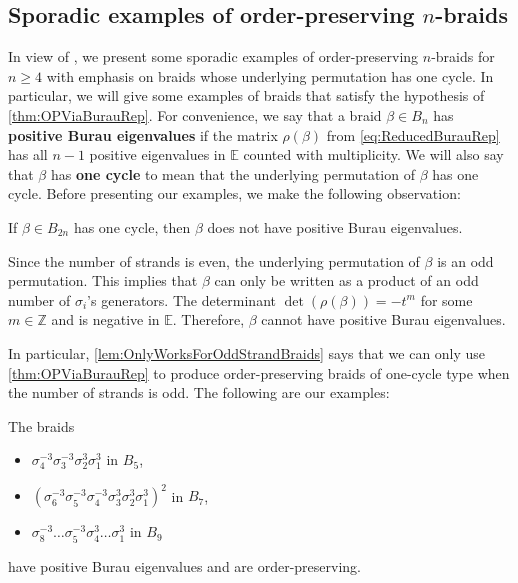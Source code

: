 \documentclass{amsart}
\makeatletter
\renewenvironment{proof}[1][\proofname]{%
   \par\pushQED{\qed}\normalfont%
   \topsep6\p@\@plus6\p@\relax
   \trivlist\item[\hskip\labelsep\bfseries#1\@addpunct{.}]%
   \ignorespaces
}{%
   \popQED\endtrivlist\@endpefalse
}
\makeatother
\begin{document}
\subsection{Sporadic examples of order-preserving $n$-braids}
\label{subsec:SporadicExamples}

In view of \cite[Question 6.10]{KinRolfsen18}, we present some sporadic examples of order-preserving $n$-braids for $n \geq 4$ with emphasis on braids whose underlying permutation has one cycle. In particular, we will give some examples of braids that satisfy the hypothesis of \cref{thm:OPViaBurauRep}. For convenience, we say that a braid $\beta \in B_n$ has {\bf positive Burau eigenvalues} if the matrix $\rho(\beta)$ from \cref{eq:ReducedBurauRep} has all $n-1$ positive eigenvalues in $\mathbb{E}$ counted with multiplicity. We will also say that $\beta$ has {\bf one cycle} to mean that the underlying permutation of $\beta$ has one cycle. Before presenting our examples, we make the following observation:

\begin{lem}
    \label{lem:OnlyWorksForOddStrandBraids}
    If $\beta \in B_{2n}$ has one cycle, then $\beta$ does not have positive Burau eigenvalues.      
\end{lem}

\begin{proof}
    Since the number of strands is even, the underlying permutation of $\beta$ is an odd permutation. This implies that $\beta$ can only be written as a product of an odd number of $\sigma_i$'s generators. The determinant $\det(\rho(\beta)) = -t^m$ for some $m \in \mathbb{Z}$ and is negative in $\mathbb{E}$. Therefore, $\beta$ cannot have positive Burau eigenvalues.    
\end{proof}

In particular, \cref{lem:OnlyWorksForOddStrandBraids} says that we can only use \cref{thm:OPViaBurauRep} to produce order-preserving braids of one-cycle type when the number of strands is odd. The following are our examples:

\begin{prop}
    The braids 
    \begin{itemize}
        \item $\sigma_4^{-3}\sigma_3^{-3}\sigma_2^3\sigma_1^3$ in $B_5$,
        \item $(\sigma_6^{-3}\sigma_5^{-3}\sigma_4^{-3}\sigma_3^{3}\sigma_2^{3}\sigma_1^{3})^2$ in $B_7$,
        \item $\sigma_8^{-3}\dots\sigma_5^{-3}\sigma_4^{3}\dots\sigma_1^{3}$ in $B_9$
    \end{itemize}  
    have positive Burau eigenvalues and are order-preserving.
\end{prop}
\end{document}
